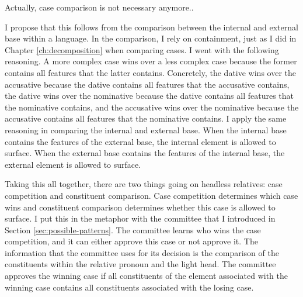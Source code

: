 Actually, case comparison is not necessary anymore..

I propose that this follows from the comparison between the internal and external base within a language.
In the comparison, I rely on containment, just as I did in Chapter \ref{ch:decomposition} when comparing cases. I went with the following reasoning. A more complex case wins over a less complex case because the former contains all features that the latter contains. Concretely, the dative wins over the accusative because the dative contains all features that the accusative contains, the dative wins over the nominative because the dative contains all features that the nominative contains, and the accusative wins over the nominative because the accusative contains all features that the nominative contains.
I apply the same reasoning in comparing the internal and external base. When the internal base contains the features of the external base, the internal element is allowed to surface. When the external base contains the features of the internal base, the external element is allowed to surface.

Taking this all together, there are two things going on headless relatives: case competition and constituent comparison. Case competition determines which case wins and constituent comparison determines whether this case is allowed to surface.
I put this in the metaphor with the committee that I introduced in Section \ref{sec:possible-patterns}. The committee learns who wins the case competition, and it can either approve this case or not approve it. The information that the committee uses for its decision is the comparison of the constituents within the relative pronoun and the light head. The committee approves the winning case if all constituents of the element associated with the winning case contains all constituents associated with the losing case.





